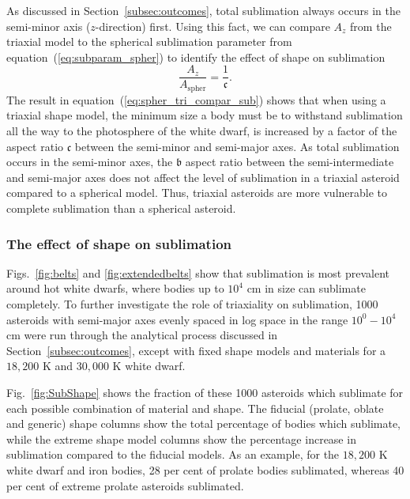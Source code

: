 \documentclass[fleqn,usenatbib]{mnras}
\begin{document}
As discussed in Section~\ref{subsec:outcomes}, total sublimation always occurs in the semi-minor axis ($z$-direction) first. 
Using this fact, we can compare $A_z$ from the triaxial model to the spherical sublimation parameter from equation~(\ref{eq:subparam_spher}) to identify the effect of shape on sublimation
\begin{equation}
    \label{eq:spher_tri_compar_sub}
    \frac{A_z}{A_\text{spher}} = \frac{1}{\mathfrak{c}}.
\end{equation}
The result in equation~(\ref{eq:spher_tri_compar_sub}) shows that when using a triaxial shape model, the minimum size a body must be to withstand sublimation all the way to the photosphere of the white dwarf, is increased by a factor of the aspect ratio $\mathfrak{c}$ between the semi-minor and semi-major axes. 
As total sublimation occurs in the semi-minor axes, the $\mathfrak{b}$ aspect ratio between the semi-intermediate and semi-major axes does not affect the level of sublimation in a triaxial asteroid compared to a spherical model.
Thus, triaxial asteroids are more vulnerable to complete sublimation than a spherical asteroid.

\subsubsection{The effect of shape on sublimation} \label{subsubsec:shape_sub}
Figs.~\ref{fig:belts} and \ref{fig:extendedbelts} show that sublimation is most prevalent around hot white dwarfs, where bodies up to $10^4$ cm in size can sublimate completely.
To further investigate the role of triaxiality on sublimation, 1000 asteroids with semi-major axes evenly spaced in log space in the range $10^0-10^4$ cm were run through the analytical process discussed in Section~\ref{subsec:outcomes}, except with fixed shape models and materials for a $18,200$ K and $30,000$ K white dwarf.

Fig.~\ref{fig:SubShape} shows the fraction of these 1000 asteroids which sublimate for each possible combination of material and shape. 
The fiducial (prolate, oblate and generic) shape columns show the total percentage of bodies which sublimate, while the extreme shape model columns show the percentage increase in sublimation compared to the fiducial models. 
As an example, for the $18,200$ K white dwarf and iron bodies, 28 per cent of prolate bodies sublimated, whereas 40 per cent of extreme prolate asteroids sublimated. 
\end{document}
